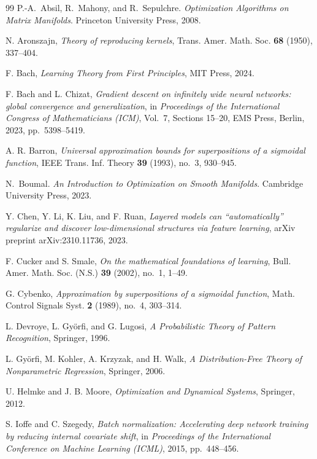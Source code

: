 \documentclass[a4paper]{article}
\theoremstyle{definition}
\newcommand{\1}{\mathbbm{1}}
\begin{document}
	\begin{thebibliography}{99}
		P.-A.~Absil, R.~Mahony, and R.~Sepulchre.
		\newblock \textit{Optimization Algorithms on Matrix Manifolds}.
		\newblock Princeton University Press, 2008.
		
		
		 N. Aronszajn, \textit{Theory of reproducing kernels}, Trans. Amer. Math. Soc. \textbf{68} (1950), 337--404.
		
		 F. Bach, \textit{Learning Theory from First Principles}, MIT Press, 2024.
		
		 F. Bach and L. Chizat, \textit{Gradient descent on infinitely wide neural networks: global convergence and generalization}, in \textit{Proceedings of the International Congress of Mathematicians (ICM)}, Vol.~7, Sections 15--20, EMS Press, Berlin, 2023, pp.~5398--5419.
		
		 A. R. Barron, \textit{Universal approximation bounds for superpositions of a sigmoidal function}, IEEE Trans. Inf. Theory \textbf{39} (1993), no.~3, 930--945.
		
		N.~Boumal.
		\newblock \textit{An Introduction to Optimization on Smooth Manifolds}.
		\newblock Cambridge University Press, 2023.
		
		
		
		 Y. Chen, Y. Li, K. Liu, and F. Ruan, \textit{Layered models can ``automatically'' regularize and discover low-dimensional structures via feature learning}, arXiv preprint arXiv:2310.11736, 2023.
		
		 F. Cucker and S. Smale, \textit{On the mathematical foundations of learning}, Bull. Amer. Math. Soc. (N.S.) \textbf{39} (2002), no.~1, 1--49.
		
		 G. Cybenko, \textit{Approximation by superpositions of a sigmoidal function}, Math. Control Signals Syst. \textbf{2} (1989), no.~4, 303--314.
		
		 L. Devroye, L. Györfi, and G. Lugosi, \textit{A Probabilistic Theory of Pattern Recognition}, Springer, 1996.
		
		 L. Györfi, M. Kohler, A. Krzyzak, and H. Walk, \textit{A Distribution-Free Theory of Nonparametric Regression}, Springer, 2006.
		
		 U. Helmke and J. B. Moore, \textit{Optimization and Dynamical Systems}, Springer, 2012.
		
		 S. Ioffe and C. Szegedy, \textit{Batch normalization: Accelerating deep network training by reducing internal covariate shift}, in \textit{Proceedings of the International Conference on Machine Learning (ICML)}, 2015, pp.~448--456.
		

\end{thebibliography}
\end{document}
